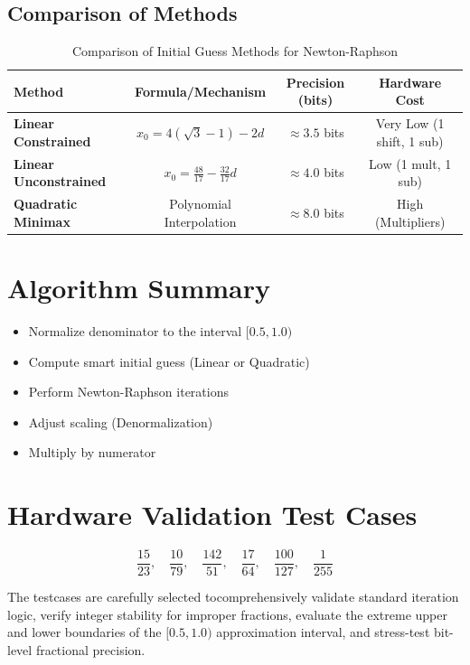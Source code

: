 \documentclass{article}
\begin{document}
\subsection{Comparison of Methods}

\begin{table}[h]
    \centering
    \begin{tabular}{lccc}
        \toprule
        \textbf{Method} & \textbf{Formula/Mechanism} & \textbf{Precision (bits)} & \textbf{Hardware Cost} \\
        \midrule
        \textbf{Linear Constrained} & $x_0 = 4(\sqrt{3}-1) - 2d$ & $\approx 3.5$ bits & Very Low (1 shift, 1 sub) \\
        \textbf{Linear Unconstrained} & $x_0 = \frac{48}{17} - \frac{32}{17}d$ & $\approx 4.0$ bits & Low (1 mult, 1 sub) \\
        \textbf{Quadratic Minimax} & Polynomial Interpolation & $\approx 8.0$ bits & High (Multipliers) \\
        \bottomrule
    \end{tabular}
    \caption{Comparison of Initial Guess Methods for Newton-Raphson}
\end{table}

\section{Algorithm Summary}

\begin{itemize}
    \item Normalize denominator to the interval $[0.5, 1.0)$
    \item Compute smart initial guess (Linear or Quadratic) 
    \item Perform Newton-Raphson iterations
    \item Adjust scaling (Denormalization) 
    \item Multiply by numerator
\end{itemize}

\section{Hardware Validation Test Cases}

\[
\frac{15}{23}, \quad \frac{10}{79}, \quad \frac{142}{51}, \quad \frac{17}{64}, \quad \frac{100}{127}, \quad \frac{1}{255}
\]

The testcases are carefully selected tocomprehensively validate standard iteration logic, verify integer stability for improper fractions, evaluate the extreme upper and lower boundaries of the $[0.5, 1.0)$ approximation interval, and stress-test bit-level fractional precision.
\end{document}
